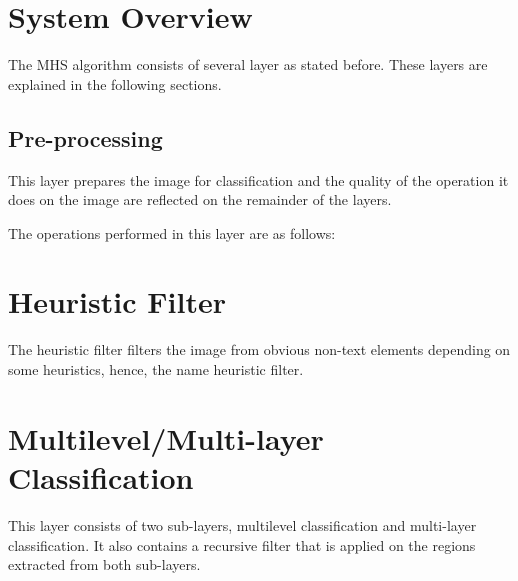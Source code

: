 \documentclass[12pt]{report}
\begin{document}
    \chapter{System Overview}

    The MHS algorithm consists of several layer as stated before.
    These layers are explained in the following sections.


    \section{Pre-processing}

    This layer prepares the image for classification and the quality of the operation it does on the image are reflected
    on the remainder of the layers.

    The operations performed in this layer are as follows:


    \chapter{Heuristic Filter}

    The heuristic filter filters the image from obvious non-text elements depending on some heuristics, hence, the name
    heuristic filter.


    \chapter{Multilevel/Multi-layer Classification}

    This layer consists of two sub-layers, multilevel classification and multi-layer classification.
    It also contains a recursive filter that is applied on the regions extracted from both sub-layers.

\end{document}
